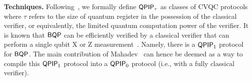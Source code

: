 %

\vspace{2mm} \noindent \textbf{Techniques.} Following~\cite{FOCS:Mahadev18a}, we formally define $\operatorname{\mathsf{QPIP}}_{\tau}$ as classes of CVQC protocols where $\tau$ refers to the size of quantum register in the possession of the classical verifier, or equivalently, the limited quantum computation power of the verifier. 
It is known that $\operatorname{\mathsf{BQP}}$ can be efficiently verified by a classical verifier that can perform a single qubit X or Z measurement~\cite{PhysRevA.93.022326, mf16}. 
Namely, there is a $\operatorname{\mathsf{QPIP}}_1$ protocol for $\operatorname{\mathsf{BQP}}$. 
The main contribution of Mahadev~\cite{FOCS:Mahadev18a} can hence be deemed as a way to compile this $\operatorname{\mathsf{QPIP}}_1$ protocol into a $\operatorname{\mathsf{QPIP}}_0$ protocol (i.e., with a fully classical verifier).

